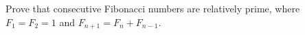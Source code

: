 Prove that consecutive Fibonacci numbers are relatively prime, where $F_1=F_2=1$ and $F_{n+1}=F_n+F_{n-1}$.

